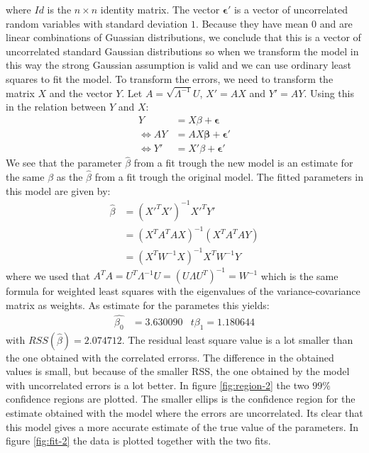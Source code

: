 \documentclass[a4paper]{article}
\begin{document}
where $Id$ is the $n\times n$ identity matrix. The vector $\mathbf{\epsilon}'$ is a vector of uncorrelated random variables with standard deviation $1$. Because they have mean $0$ and are linear combinations of Guassian distributions, we conclude that this is a vector of uncorrelated standard Gaussian distributions so when we transform the model in this way the strong Gaussian assumption is valid and we can use ordinary least squares to fit the model.
To transform the errors, we need to transform the matrix $X$ and the vector $Y$. Let $A = \sqrt{\Lambda^{-1}}U$, $X' = AX$ and $Y' = AY$. Using this in the relation between $Y$ and $X$:
\begin{align*}
	Y &= X\beta + \mathbf{\epsilon}\\
	\Leftrightarrow AY &= AX\mathbf{\beta} + \mathbf{\epsilon}'\\
	\Leftrightarrow Y' &= X'\beta + \mathbf{\epsilon}'
\end{align*}
We see that the parameter $\hat{\beta}$ from a fit trough the new model is an estimate for the same $\beta$ as the $\hat{\beta}$ from a fit trough the original model.
The fitted parameters in this model are given by:
\begin{align*}
	\hat{\beta} &= (X'^TX')^{-1} X'^TY'\\
		    &= (X^T A^T A X)^{-1} (X^T A^T A Y)\\
		    &= (X^T W^{-1} X)^{-1} X^T W^{-1} Y
\end{align*}
where we used that $A^TA = U^T\Lambda^{-1}U= (U \Lambda U^T)^{-1} = W^{-1}$
which is the same formula for weighted least squares with the eigenvalues of the variance-covariance matrix as weights. As estimate for the parametes this yields:
\begin{align*}
	\hat{\beta_0} &= 3.630090 &t{\beta_1} = 1.180644
\end{align*}
with $RSS(\hat{\beta})=2.074712$. The residual least square value is a lot smaller than the one obtained with the correlated errorss. The difference in the obtained values is small, but because of the smaller RSS, the one obtained by the model with uncorrelated errors is a lot better. In figure \ref{fig:region-2} the two $99\%$ confidence regions are plotted. The smaller ellips is the confidence region for the estimate obtained with the model where the errors are uncorrelated. Its clear that this model gives a more accurate estimate of the true value of the parameters. In figure \ref{fig:fit-2} the data is plotted together with the two fits.
\end{document}
